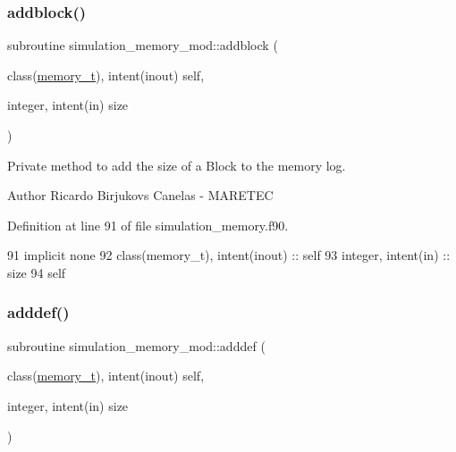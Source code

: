 \subsubsection{\texorpdfstring{addblock()}{addblock()}}
{\footnotesize\ttfamily subroutine simulation\+\_\+memory\+\_\+mod\+::addblock (\begin{DoxyParamCaption}\item[{class(\mbox{\hyperlink{structsimulation__memory__mod_1_1memory__t}{memory\+\_\+t}}), intent(inout)}]{self,  }\item[{integer, intent(in)}]{size }\end{DoxyParamCaption})\hspace{0.3cm}{\ttfamily [private]}}



Private method to add the size of a Block to the memory log. 

\begin{DoxyAuthor}{Author}
Ricardo Birjukovs Canelas -\/ M\+A\+R\+E\+T\+EC 
\end{DoxyAuthor}


Definition at line 91 of file simulation\+\_\+memory.\+f90.


\begin{DoxyCode}
91     \textcolor{keywordtype}{implicit none}
92     \textcolor{keywordtype}{class}(memory\_t), \textcolor{keywordtype}{intent(inout)} :: self
93     \textcolor{keywordtype}{integer}, \textcolor{keywordtype}{intent(in)} :: size
94     self%
\end{DoxyCode}
\mbox{\label{namespacesimulation__memory__mod_ac6d6853bc462947d24a8f6234d625138}} 
\subsubsection{\texorpdfstring{adddef()}{adddef()}}
{\footnotesize\ttfamily subroutine simulation\+\_\+memory\+\_\+mod\+::adddef (\begin{DoxyParamCaption}\item[{class(\mbox{\hyperlink{structsimulation__memory__mod_1_1memory__t}{memory\+\_\+t}}), intent(inout)}]{self,  }\item[{integer, intent(in)}]{size }\end{DoxyParamCaption})\hspace{0.3cm}{\ttfamily [private]}}




